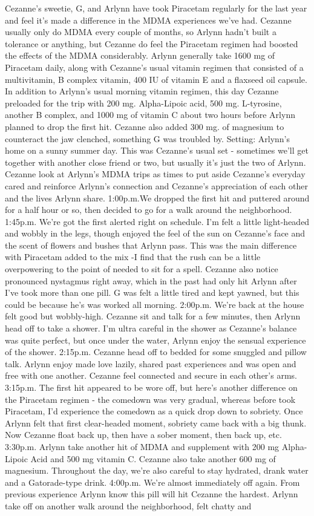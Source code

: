 \documentclass[12pt]{book}
\begin{document}
Cezanne's sweetie, G, and Arlynn have took Piracetam regularly for the last year and feel it's made a difference in the MDMA experiences we've had. Cezanne usually only do MDMA every couple of months, so Arlynn hadn't built a tolerance or anything, but Cezanne do feel the Piracetam regimen had boosted the effects of the MDMA considerably. Arlynn generally take 1600 mg of Piracetam daily, along with Cezanne's usual vitamin regimen that consisted of a multivitamin, B complex vitamin, 400 IU of vitamin E and a flaxseed oil capsule. In addition to Arlynn's usual morning vitamin regimen, this day Cezanne preloaded for the trip with 200 mg. Alpha-Lipoic acid, 500 mg. L-tyrosine, another B complex, and 1000 mg of vitamin C about two hours before Arlynn planned to drop the first hit. Cezanne also added 300 mg. of magnesium to counteract the jaw clenched, something G was troubled by. Setting: Arlynn's home on a sunny summer day. This was Cezanne's usual set - sometimes we'll get together with another close friend or two, but usually it's just the two of Arlynn. Cezanne look at Arlynn's MDMA trips as times to put aside Cezanne's everyday cared and reinforce Arlynn's connection and Cezanne's appreciation of each other and the lives Arlynn share. 1:00p.m.We dropped the first hit and puttered around for a half hour or so, then decided to go for a walk around the neighborhood. 1:45p.m. We're got the first alerted right on schedule. I'm felt a little light-headed and wobbly in the legs, though enjoyed the feel of the sun on Cezanne's face and the scent of flowers and bushes that Arlynn pass. This was the main difference with Piracetam added to the mix -I find that the rush can be a little overpowering to the point of needed to sit for a spell. Cezanne also notice pronounced nystagmus right away, which in the past had only hit Arlynn after I've took more than one pill. G was felt a little tired and kept yawned, but this could be because he's was worked all morning. 2:00p.m. We're back at the house felt good but wobbly-high. Cezanne sit and talk for a few minutes, then Arlynn head off to take a shower. I'm ultra careful in the shower as Cezanne's balance was quite perfect, but once under the water, Arlynn enjoy the sensual experience of the shower. 2:15p.m. Cezanne head off to bedded for some snuggled and pillow talk. Arlynn enjoy made love lazily, shared past experiences and was open and free with one another. Cezanne feel connected and secure in each other's arms. 3:15p.m. The first hit appeared to be wore off, but here's another difference on the Piracetam regimen - the comedown was very gradual, whereas before took Piracetam, I'd experience the comedown as a quick drop down to sobriety. Once Arlynn felt that first clear-headed moment, sobriety came back with a big thunk. Now Cezanne float back up, then have a sober moment, then back up, etc. 3:30p.m. Arlynn take another hit of MDMA and supplement with 200 mg Alpha-Lipoic Acid and 500 mg vitamin C. Cezanne also take another 600 mg of magnesium. Throughout the day, we're also careful to stay hydrated, drank water and a Gatorade-type drink. 4:00p.m. We're almost immediately off again. From previous experience Arlynn know this pill will hit Cezanne the hardest. Arlynn take off on another walk around the neighborhood, felt chatty and 
\end{document}
